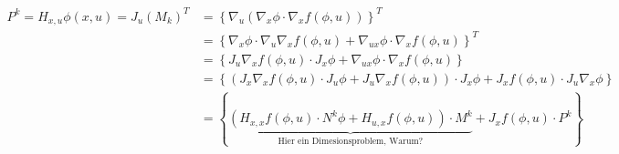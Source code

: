 \documentclass[12pt, a4paper]{scrartcl}
\begin{document}
\begin{align*}
P^k = H_{x, u} \phi(x, u) = J_{u} {(M_k)^T} &= \left\{\nabla_u \left(\nabla_x \phi \cdot \nabla_x f(\phi, u)\right)\right\}^T \\
&= \left\{ \nabla_x \phi \cdot \nabla_u \nabla_x f(\phi, u) + \nabla_{ux} \phi \cdot  \nabla_x f(\phi, u)  \right\}^T \\
&= \left\{ J_u \nabla_x f(\phi, u) \cdot J_x \phi + \nabla_{ux} \phi \cdot  \nabla_x f(\phi, u)  \right\} \\
&= \left\{ \left(J_x \nabla_x f(\phi, u) \cdot J_u \phi + J_u \nabla_x f(\phi, u) \right)   \cdot J_x \phi +   J_x f(\phi, u) \cdot J_u \nabla_x \phi  \right\} \\
&= \left\{ \underbrace{\left(H_{x, x} f(\phi, u) \cdot N^k \phi + H_{u, x} f(\phi, u) \right)   \cdot M^k }_{\text{Hier ein Dimesionsproblem, Warum?}}+  J_x f(\phi, u) \cdot  P^k  \right\} 
\end{align*}
\end{document}
